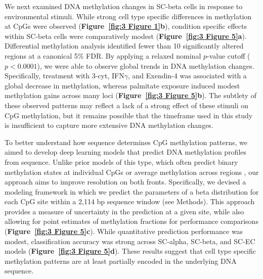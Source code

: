 We next examined DNA methylation changes in SC-beta cells in response to environmental stimuli. While strong cell type specific differences in methylation at CpGs were observed (\textbf{Figure~\ref{fig:3 Figure 1}\textbf{b}}), condition specific effects within SC-beta cells were comparatively modest (\textbf{Figure~\ref{fig:3 Figure 5}\textbf{a}}). Differential methylation analysis identified fewer than 10 significantly altered regions at a canonical 5\% FDR. By applying a relaxed nominal $p$-value cutoff ($p < 0.0001$), we were able to observe global trends in DNA methylation changes. Specifically, treatment with 3-cyt, IFN$\gamma$, and Exendin-4 was associated with a global decrease in methylation, whereas palmitate exposure induced modest methylation gains across many loci (\textbf{Figure~\ref{fig:3 Figure 5}\textbf{b}}). The subtlety of these observed patterns may reflect a lack of a strong effect of these stimuli on CpG methylation, but it remains possible that the timeframe used in this study is insufficient to capture more extensive DNA methylation changes.

To better understand how sequence determines CpG methylation patterns, we aimed to develop deep learning models that predict DNA methylation profiles from sequence. Unlike prior models of this type, which often predict binary methylation states at individual CpGs or average methylation across regions \cite{Zeng2017-kb}, our approach aims to improve resolution on both fronts. Specifically, we devised a modeling framework in which we predict the parameters of a beta distribution for each CpG site within a 2,114 bp sequence window (see Methods). This approach provides a measure of uncertainty in the prediction at a given site, while also allowing for point estimates of methylation fractions for performance comparisons (\textbf{Figure~\ref{fig:3 Figure 5}\textbf{c}}). While quantitative prediction performance was modest, classification accuracy was strong across SC-alpha, SC-beta, and SC-EC models (\textbf{Figure~\ref{fig:3 Figure 5}\textbf{d}}). These results suggest that cell type specific methylation patterns are at least partially encoded in the underlying DNA sequence.

\clearpage

